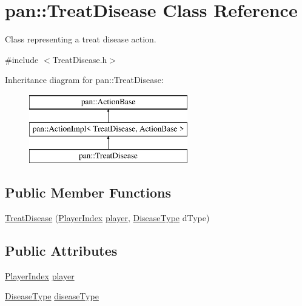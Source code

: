 \hypertarget{classpan_1_1_treat_disease}{}\section{pan\+:\+:Treat\+Disease Class Reference}
\label{classpan_1_1_treat_disease}


Class representing a treat disease action.  




{\ttfamily \#include $<$Treat\+Disease.\+h$>$}

Inheritance diagram for pan\+:\+:Treat\+Disease\+:\begin{figure}[H]
\begin{center}
\leavevmode
\includegraphics[height=3.000000cm]{classpan_1_1_treat_disease}
\end{center}
\end{figure}
\subsection*{Public Member Functions}
\begin{DoxyCompactItemize}
\item 
\hyperlink{classpan_1_1_treat_disease_a5c47ff414235ac559fb2236ddb00dcaa}{Treat\+Disease} (\hyperlink{namespacepan_a0cdabf874fbf1bb3a1f0152d108c2909}{Player\+Index} \hyperlink{classpan_1_1_treat_disease_a03aa74052746dc12d607458b260281db}{player}, \hyperlink{namespacepan_a48851b51b0aef3f0e1be80df5031d9d7}{Disease\+Type} d\+Type)
\end{DoxyCompactItemize}
\subsection*{Public Attributes}
\begin{DoxyCompactItemize}
\item 
\hyperlink{namespacepan_a0cdabf874fbf1bb3a1f0152d108c2909}{Player\+Index} \hyperlink{classpan_1_1_treat_disease_a03aa74052746dc12d607458b260281db}{player}
\item 
\hyperlink{namespacepan_a48851b51b0aef3f0e1be80df5031d9d7}{Disease\+Type} \hyperlink{classpan_1_1_treat_disease_a9ab5c64aa8c996c62a25b6f1fdf1d4c6}{disease\+Type}
\end{DoxyCompactItemize}


